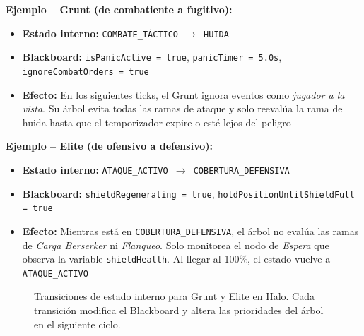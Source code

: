 \documentclass[12pt,letterpaper]{article}
\begin{document}
\textbf{Ejemplo -- Grunt (de combatiente a fugitivo):}
\begin{itemize}[nosep]
  \item \textbf{Estado interno:} \texttt{COMBATE\_TÁCTICO $\to$ HUIDA}
  \item \textbf{Blackboard:} \texttt{isPanicActive = true}, \texttt{panicTimer = 5.0s}, \texttt{ignoreCombatOrders = true}
  \item \textbf{Efecto:} En los siguientes ticks, el Grunt ignora eventos como \textit{jugador a la vista}. Su árbol evita todas las ramas de ataque y solo reevalúa la rama de huida hasta que el temporizador expire o esté lejos del peligro
\end{itemize}

\textbf{Ejemplo -- Elite (de ofensivo a defensivo):}
\begin{itemize}[nosep]
  \item \textbf{Estado interno:} \texttt{ATAQUE\_ACTIVO $\to$ COBERTURA\_DEFENSIVA}
  \item \textbf{Blackboard:} \texttt{shieldRegenerating = true}, \texttt{holdPositionUntilShieldFull = true}
  \item \textbf{Efecto:} Mientras está en \texttt{COBERTURA\_DEFENSIVA}, el árbol no evalúa las ramas de \textit{Carga Berserker} ni \textit{Flanqueo}. Solo monitorea el nodo de \textit{Espera} que observa la variable \texttt{shieldHealth}. Al llegar al 100\%, el estado vuelve a \texttt{ATAQUE\_ACTIVO}
\end{itemize}

\begin{figure}[H]
\centering
{}
\caption{Transiciones de estado interno para Grunt y Elite en Halo. Cada transición modifica el Blackboard y altera las prioridades del árbol en el siguiente ciclo.}
\end{figure}
\end{document}
